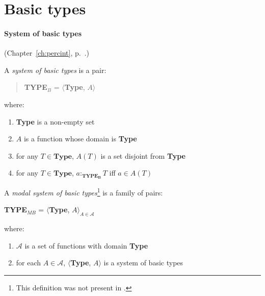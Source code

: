 


\section{Basic types}
\label{sec:basic}

\paragraph{System of basic types} (Chapter~\ref{ch:percint}, p.~\pageref{ex:def-basic-types}.)

A {\it system of basic types\/} is a pair:
\begin{quote}
{\bf TYPE$_B$} = $\langle${\bf Type}, $A$$\rangle$
\end{quote}
where:
\begin{enumerate} 
 
\item \textbf{Type} is a non-empty set 
 
\item $A$ is a function whose domain is \textbf{Type}

\item for any $T\in\textbf{Type}$, $A(T)$ is a set disjoint from
  \textbf{Type}

\item for any $T\in\textbf{Type}$, $a:_{\mathbf{TYPE_B}}T$ iff $a\in A(T)$
 
\end{enumerate}


A \textit{modal system of basic types}\footnote{This definition was not present in \cite{Cooper2012}.} is a family of
pairs:
\begin{display}
\textbf{TYPE$_{\mathit{MB}}$} = $\langle${\bf Type},
$A\rangle_{A\in\mathcal{A}}$
\end{display}
where:
\begin{enumerate} 
 
\item $\mathcal{A}$ is a set of functions with domain \textbf{Type} 
 
\item for each $A\in\mathcal{A}$, $\langle${\bf Type}, $A\rangle$ is a
  system of basic types
 
\end{enumerate} 

